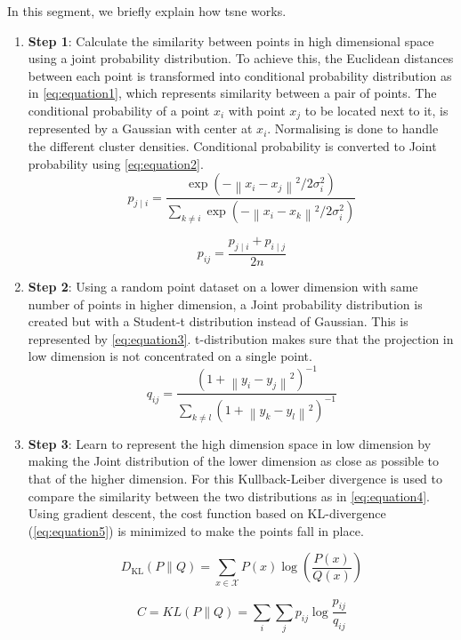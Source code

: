 In this segment, we briefly explain how \gls{tsne} works.

\begin{enumerate}
    \item \textbf{Step 1}: Calculate the similarity between points in high dimensional space using a joint probability distribution.
    To achieve this, the Euclidean distances between each point is transformed into conditional probability distribution as in \autoref{eq:equation1}, which represents similarity between a pair of points.
    The conditional probability of a point $x_i$ with point $x_j$ to be located next to it, is represented by a Gaussian with center at $x_i$.
    Normalising is done to handle the different cluster densities.
    Conditional probability is converted to Joint probability using \autoref{eq:equation2}.
    \begin{equation}
        p_{j \mid i}=\frac{\exp \left(-\left\|x_{i}-x_{j}\right\|^{2} / 2 \sigma_{i}^{2}\right)}{\sum_{k \neq i} \exp \left(-\left\|x_{i}-x_{k}\right\|^{2} / 2 \sigma_{i}^{2}\right)}
        \label{eq:equation1}
    \end{equation}

    \begin{equation}
        p_{i j}=\frac{p_{j \mid i}+p_{i \mid j}}{2 n}
        \label{eq:equation2}
    \end{equation}

    \item \textbf{Step 2}: Using a random point dataset on a lower dimension with same number of points in higher dimension, a Joint probability distribution is created but with a Student-t distribution instead of Gaussian.
    This is represented by \autoref{eq:equation3}.
    t-distribution makes sure that the projection in low dimension is not concentrated on a single point.
    \begin{equation}
        q_{ij} = \frac{(1+\left \| y_{i}-y_{j} \right \|^{2})^{-1}}{\sum _{k\neq l} (1+\left \| y_{k}-y_{l} \right \|^{2})^{-1}}
        \label{eq:equation3}
    \end{equation}

    \item \textbf{Step 3}: Learn to represent the high dimension space in low dimension by making the Joint distribution of the lower dimension as close as possible to that of the higher dimension.
    For this Kullback-Leiber divergence\cite{Joyce2011} is used to compare the similarity between the two distributions as in \autoref{eq:equation4}.
    Using gradient descent, the cost function based on KL-divergence (\autoref{eq:equation5}) is minimized to make the points fall in place.

    \begin{equation}
        D_{\mathrm{KL}}(P \| Q)=\sum_{x \in \mathcal{X}} P(x) \log \left(\frac{P(x)}{Q(x)}\right)
        \label{eq:equation4}
    \end{equation}

    \begin{equation}
        C=K L(P \| Q)=\sum_{i} \sum_{j} p_{i j} \log \frac{p_{i j}}{q_{i j}}
        \label{eq:equation5}
    \end{equation}
\end{enumerate}

